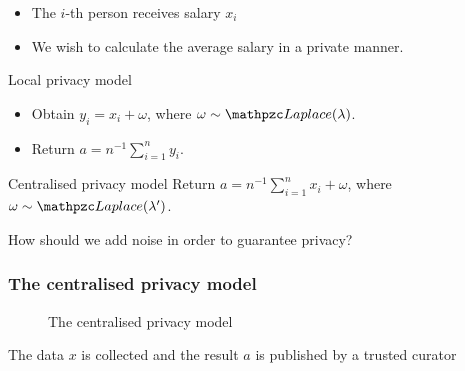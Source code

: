 \begin{frame}
  \begin{example}
    \begin{itemize}
    \item The $i$-th person receives salary $x_i$
    \item We wish to calculate the average salary in a private manner.
    \end{itemize}
  \end{example}
  \begin{block}{Local privacy model}
    \begin{itemize}
    \item Obtain $y_i = x_i + \omega$, where $\omega \sim \Laplace(\lambda)$.
    \item Return $a = n^{-1} \sum_{i=1}^n y_i$.
    \end{itemize}
  \end{block}
  \begin{block}{Centralised privacy model}
    Return $a = n^{-1} \sum_{i=1}^n x_i + \omega$, where $\omega \sim \Laplace(\lambda')$.
  \end{block}
  
  How should we add noise in order to guarantee privacy?
\end{frame}

\begin{frame}
  \frametitle{The centralised privacy model}
  \begin{figure}[H]
    \centering
    
    \caption{The centralised privacy model}
    \label{fig:centralised-privacy}
  \end{figure}
  \begin{assumption}
    The data $x$ is collected and the result $a$ is published by a \alert{trusted curator}
  \end{assumption}
\end{frame}

